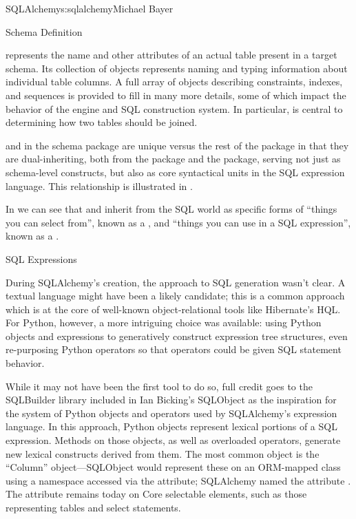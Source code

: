 \begin{aosachapter}{SQLAlchemy}{s:sqlalchemy}{Michael Bayer}
\begin{aosasect1}{Schema Definition}

 represents the name and other attributes of an actual table
present in a target schema.  Its collection of  objects
represents naming and typing information about individual table columns.
A full array of objects describing constraints, indexes, and sequences
is provided to fill in many more details, some of which impact the
behavior of the engine and SQL construction system.  In particular, 
is central to determining how two tables should be joined.

 and  in the schema package are unique versus the rest of the
package in that they are dual-inheriting, both from the  package and
the  package, serving not just as schema-level
constructs, but also as core syntactical units in the SQL expression language.
This relationship is illustrated in .


In  we can see that  and  inherit from the SQL world as
specific forms of ``things you can select from'', known as a ,
and ``things you can use in a SQL expression'', known as a .

\end{aosasect1}

\begin{aosasect1}{SQL Expressions}

During SQLAlchemy's creation, the
approach to SQL generation wasn't clear. A textual
language might have been a likely candidate; this is a common
approach which is at the core of well-known object-relational tools
like Hibernate's HQL. For Python, however, a more intriguing
choice was available: using Python objects and expressions
to generatively construct expression tree structures, even
re-purposing Python operators so that operators
could be given SQL statement behavior.

While it may not have been the first tool to do so, full
credit goes to the SQLBuilder library included in Ian
Bicking's SQLObject as the inspiration for the
system of Python objects and operators used by
SQLAlchemy's expression language. In this approach,
Python objects represent lexical portions of a SQL
expression. Methods on those objects, as well as
overloaded operators, generate new lexical constructs
derived from them. The most common object is the ``Column''
object---SQLObject would represent these on an ORM-mapped
class using a namespace accessed via the  attribute;
SQLAlchemy named the attribute . The 
attribute remains today on Core selectable elements,
such as those representing tables and select statements.


\end{aosasect1}
\end{aosachapter}
